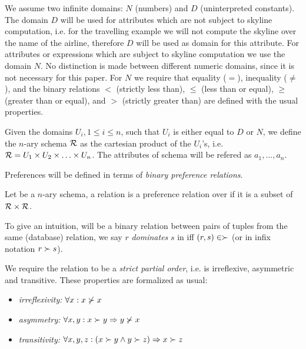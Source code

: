 We assume two infinite domains: $N$ (numbers) and $D$ (uninterpreted constants). The domain $D$ will be used for attributes which are not subject to skyline computation, i.e. for the travelling example we will not compute the skyline over the name of the airline, therefore $D$ will be used as domain for this attribute.
For attributes or expressions which are subject to skyline computation we use the domain $N$. No distinction is made between different numeric domains, since it is not necessary for this paper. For $N$ we require that equality ($=$), inequality ($\not=$), and the binary relations $<$ (strictly less than), $\le$ (less than or equal), $\ge$ (greater than or equal), and $>$ (strictly greater than) are defined with the usual properties.

\begin{definition}[Schema]
Given the domains $U_i, 1 \le i \le n$, such that $U_i$ is either equal to $D$ or $N$, we define the $n$-ary schema $\mathcal{R}$ as the cartesian product of the $U_i$'s, i.e. $\mathcal{R} = U_1 \times U_2 \times \ldots \times U_n$. The attributes of schema  will be refered as $a_1, \ldots, a_n$.
\end{definition}

Preferences will be defined in terms of \emph{binary preference relations}.
\begin{definition}
Let  be a $n$-ary schema, a relation \dominates is a preference relation over  if it is a subset of $\mathcal{R} \times \mathcal{R}$.
\end{definition}

To give an intuition, \dominates will be a binary relation between pairs of tuples from the same (database) relation, we say $r$ \emph{dominates} $s$ in \dominates iff $(r, s) \in \succ$ (or in infix notation $r \succ s$).

We require the relation \dominates to be a \emph{strict partial order}, i.e. \dominates is irreflexive, asymmetric and transitive. These properties are formalized as usual:

\begin{itemize}
\item \emph{irreflexivity:} $\forall x: x \not\succ x$
\item \emph{asymmetry:} $\forall x, y: x \succ y \Rightarrow y \not\succ x$
\item \emph{transitivity:} $\forall x, y, z: (x \succ y \land y \succ z) \Rightarrow x \succ z$
\end{itemize}

